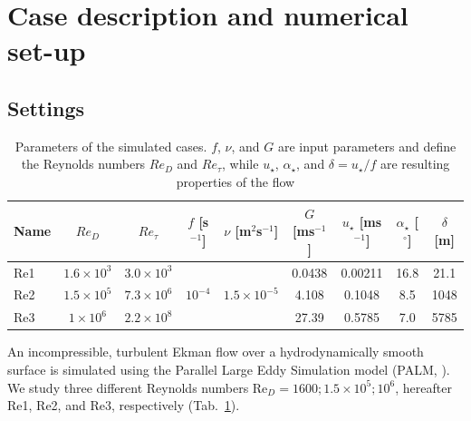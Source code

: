 \documentclass[smallcondensed,final]{svjour3}
\begin{document}
\section{Case description and numerical set-up}
\label{setup}

\subsection{Settings}

\begin{table}
	\centering
	\caption{Parameters of the simulated cases. $f$, $\nu$, and $G$ are input parameters and define the Reynolds numbers $Re_D$ and $Re_\tau$, while $u_\star$, $\alpha_\star$, and $\delta = u_\star/f$ are resulting properties of the flow}
	\begin{adjustbox}{width=\textwidth}
    \begin{tabular}{l|ccccc|ccc}
          \toprule
	  Name & $Re_D$ & $Re_\tau$ & $f$ [s$^{-1}$] & $\nu$ [m$^2$s$^{-1}$] & $G$ [ms$^{-1}$] & $u_\star$ [ms$^{-1}$] & $\alpha_\star$ [$^\circ$]& $\delta$ [m] \\
          \midrule
	  Re1 & $1.6\times10^3$ & $3.0\times10^3$ &  &  & 0.0438 & 0.00211 & 16.8 & 21.1 \\
	  Re2 & $1.5\times10^5$ & $7.3\times10^6$ & $10^{-4}$ & $1.5\times10^{-5}$ & 4.108 & 0.1048 & 8.5 & 1048\\
	  Re3 & $1\times10^6$ & $2.2\times10^8$ &  &  & 27.39 & 0.5785 & 7.0 & 5785 \\
          \bottomrule
	  \end{tabular}
  \end{adjustbox}
	\label{simulation_parameters}
\end{table}
An incompressible, turbulent Ekman flow over a hydrodynamically smooth surface is simulated using the Parallel Large Eddy Simulation model (PALM, \citealp{maronga2020overview}). We study three different Reynolds numbers Re$_D = 1600;1.5\times 10^5;10^6$, hereafter Re1, Re2, and Re3, respectively (Tab.~\ref{simulation_parameters}).
%
\end{document}

